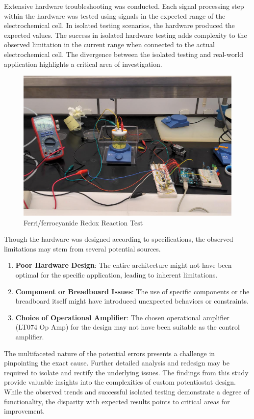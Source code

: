 \documentclass{article}
\begin{document}
Extensive hardware troubleshooting was conducted. Each signal processing step within the hardware was tested using signals in the expected range of the electrochemical cell. In isolated testing scenarios, the hardware produced the expected values. The success in isolated hardware testing adds complexity to the observed limitation in the current range when connected to the actual electrochemical cell. The divergence between the isolated testing and real-world application highlights a critical area of investigation.

\begin{figure}[H]
  \centering
  \includegraphics[width=.9\linewidth]{lab_test.png}
  \caption{Ferri/ferrocyanide Redox Reaction Test}
  \end{figure}
  

Though the hardware was designed according to specifications, the observed limitations may stem from several potential sources.
\begin{enumerate}
\item \textbf{Poor Hardware Design}: The entire architecture might not have been optimal for the specific application, leading to inherent limitations.
\item \textbf{Component or Breadboard Issues}: The use of specific components or the breadboard itself might have introduced unexpected behaviors or constraints.
\item \textbf{Choice of Operational Amplifier}: The chosen operational amplifier (LT074 Op Amp) for the design may not have been suitable as the control amplifier.
\end{enumerate}

The multifaceted nature of the potential errors presents a challenge in pinpointing the exact cause. Further detailed analysis and redesign may be required to isolate and rectify the underlying issues. The findings from this study provide valuable insights into the complexities of custom potentiostat design. While the observed trends and successful isolated testing demonstrate a degree of functionality, the disparity with expected results points to critical areas for improvement.
\end{document}
